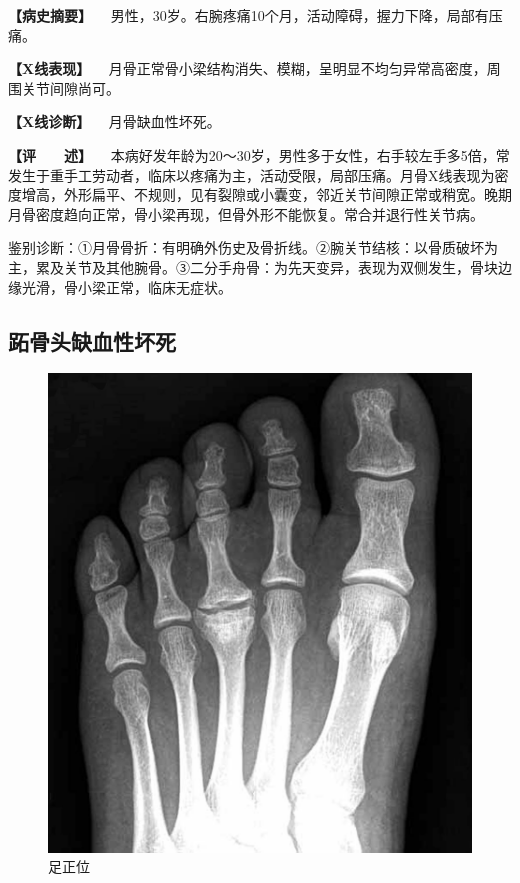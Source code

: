 \textbf{【病史摘要】}
　男性，30岁。右腕疼痛10个月，活动障碍，握力下降，局部有压痛。

\textbf{【X线表现】}
　月骨正常骨小梁结构消失、模糊，呈明显不均匀异常高密度，周围关节间隙尚可。

\textbf{【X线诊断】} 　月骨缺血性坏死。

\textbf{【评　　述】}
　本病好发年龄为20～30岁，男性多于女性，右手较左手多5倍，常发生于重手工劳动者，临床以疼痛为主，活动受限，局部压痛。月骨X线表现为密度增高，外形扁平、不规则，见有裂隙或小囊变，邻近关节间隙正常或稍宽。晚期月骨密度趋向正常，骨小梁再现，但骨外形不能恢复。常合并退行性关节病。

鉴别诊断：①月骨骨折：有明确外伤史及骨折线。②腕关节结核：以骨质破坏为主，累及关节及其他腕骨。③二分手舟骨：为先天变异，表现为双侧发生，骨块边缘光滑，骨小梁正常，临床无症状。

\subsection{跖骨头缺血性坏死}

\begin{figure}[!htbp]
 \centering
 \includegraphics{./images/Image00066.jpg}
 \captionsetup{justification=centering}
 \caption{足正位}
 \label{fig2-4-5}
  \end{figure} 

